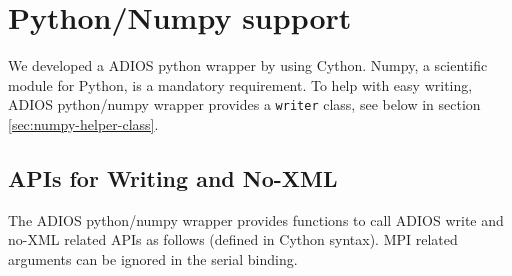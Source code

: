 \section{Python/Numpy support}
\label{section-bindings-numpy}
We developed a ADIOS python wrapper by using Cython. Numpy, a scientific module for Python, is a mandatory requirement. 
To help with easy writing, ADIOS python/numpy wrapper provides  a \verb+writer+ class, see below in section \ref{sec:numpy-helper-class}.

\subsection{APIs for Writing and No-XML}
The ADIOS python/numpy wrapper provides functions to call ADIOS write and no-XML related APIs as follows (defined in Cython syntax). MPI related arguments can be ignored in the serial binding.
